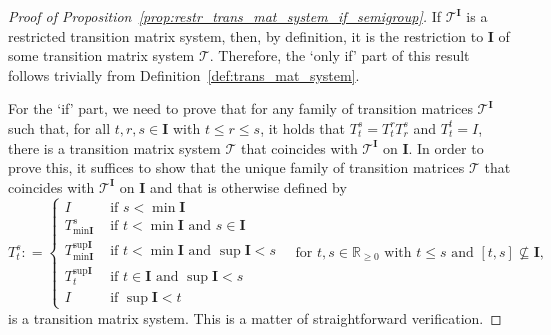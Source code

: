 \documentclass[10pt,a4paper]{paper}
\theoremstyle{definition}
\newcommand{\reals}{\mathbb{R}}
\newcommand{\realsnonneg}{\reals_{\geq 0}}
\newcommand{\coloneqq}{:\!=}
\begin{document}
\begin{proof}[Proof of Proposition~\ref{prop:restr_trans_mat_system_if_semigroup}]
If $\mathcal{T}^{\mathbf{I}}$ is a restricted transition matrix system, then, by definition, it is the restriction to $\mathbf{I}$ of some transition matrix system $\mathcal{T}$. Therefore, the `only if' part of this result follows trivially from Definition~\ref{def:trans_mat_system}.

For the `if' part, we need to prove that for any family of transition matrices $\mathcal{T}^{\mathbf{I}}$ such that, for all $t,r,s\in\mathbf{I}$ with $t\leq r\leq s$, it holds that $T_t^s = T_t^rT_r^s$ and $T_t^t=I$, there is a transition matrix system $\mathcal{T}$ that coincides with $\mathcal{T}^{\mathbf{I}}$ on $\mathbf{I}$. In order to prove this, it suffices to show that the unique family of transition matrices $\mathcal{T}$ that coincides with $\mathcal{T}^{\mathbf{I}}$ on $\mathbf{I}$ and that is otherwise defined by
\begin{equation}\label{eq:prop:restr_trans_mat_system_if_semigroup}
T_t^s
\coloneqq
\begin{cases}
I &\text{ if $s<\min \mathbf{I}$}\\
T_{\min\textbf{I}}^s &\text{ if $t<\min\textbf{I}$ and $s\in\textbf{I}$}\\
T_{\min\textbf{I}}^{\sup\textbf{I}} &\text{ if $t<\min\textbf{I}$ and $\sup\textbf{I}<s$}\\
T_t^{\sup\textbf{I}}
&\text{ if $t\in\textbf{I}$ and $\sup\textbf{I}<s$}\\
I &\text{ if $\sup\mathbf{I}<t$}
\end{cases}
~~~\text{ for $t,s\in\realsnonneg$ with $t\leq s$ and $[t,s]\not\subseteq\mathbf{I}$,}
\end{equation}
is a transition matrix system. This is a matter of straightforward verification.
\end{proof}
\end{document}
